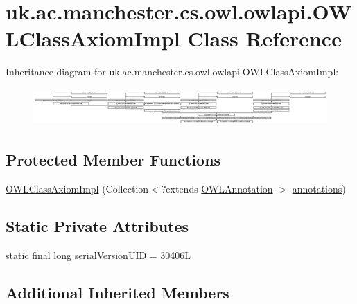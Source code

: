\hypertarget{classuk_1_1ac_1_1manchester_1_1cs_1_1owl_1_1owlapi_1_1_o_w_l_class_axiom_impl}{\section{uk.\-ac.\-manchester.\-cs.\-owl.\-owlapi.\-O\-W\-L\-Class\-Axiom\-Impl Class Reference}
\label{classuk_1_1ac_1_1manchester_1_1cs_1_1owl_1_1owlapi_1_1_o_w_l_class_axiom_impl}
}
Inheritance diagram for uk.\-ac.\-manchester.\-cs.\-owl.\-owlapi.\-O\-W\-L\-Class\-Axiom\-Impl\-:\begin{figure}[H]
\begin{center}
\leavevmode
\includegraphics[height=1.435080cm]{classuk_1_1ac_1_1manchester_1_1cs_1_1owl_1_1owlapi_1_1_o_w_l_class_axiom_impl}
\end{center}
\end{figure}
\subsection*{Protected Member Functions}
\begin{DoxyCompactItemize}
\item 
\hyperlink{classuk_1_1ac_1_1manchester_1_1cs_1_1owl_1_1owlapi_1_1_o_w_l_class_axiom_impl_ac794e3ed1173ee5b2d920a981261cd97}{O\-W\-L\-Class\-Axiom\-Impl} (Collection$<$?extends \hyperlink{interfaceorg_1_1semanticweb_1_1owlapi_1_1model_1_1_o_w_l_annotation}{O\-W\-L\-Annotation} $>$ \hyperlink{classuk_1_1ac_1_1manchester_1_1cs_1_1owl_1_1owlapi_1_1_o_w_l_axiom_impl_af6fbf6188f7bdcdc6bef5766feed695e}{annotations})
\end{DoxyCompactItemize}
\subsection*{Static Private Attributes}
\begin{DoxyCompactItemize}
\item 
static final long \hyperlink{classuk_1_1ac_1_1manchester_1_1cs_1_1owl_1_1owlapi_1_1_o_w_l_class_axiom_impl_a3445f9579e80f6d431804851418d07aa}{serial\-Version\-U\-I\-D} = 30406\-L
\end{DoxyCompactItemize}
\subsection*{Additional Inherited Members}


